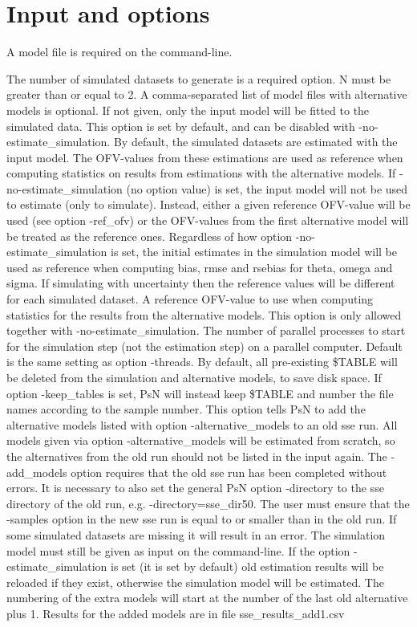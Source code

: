 \section{Input and options}
A model file is required on the command-line.
\begin{optionlist}
The number of simulated datasets to generate is a required option. N must be greater than or equal to 2. 
\nextopt
{}
A comma-separated list of model files with alternative models is optional. If not given, only the input model will be fitted to the simulated data. 
\nextopt
{}
This option is set by default, and can be disabled with -no-estimate\_simulation. By default, the simulated datasets are estimated with the input model. The OFV-values from these estimations are used as reference when computing statistics on results from estimations with the alternative models. If -no-estimate\_simulation (no option value) is set, the input model will not be used to estimate (only to simulate). Instead, either a given reference OFV-value will be used (see option -ref\_ofv) or the OFV-values from the first alternative model will be treated as the reference ones. Regardless of how option -no-estimate\_simulation is set, the initial estimates in the simulation model will be used as reference when computing bias, rmse and rsebias for theta, omega and sigma. If simulating with uncertainty then the reference values will be different for each simulated dataset. 
\nextopt
{}
A reference OFV-value to use when computing statistics for the results from the alternative models. This option is only allowed together with -no-estimate\_simulation. 
\nextopt
{}
The number of parallel processes to start for the simulation step (not the estimation step) on a parallel computer. Default is the same setting as option -threads. 
\nextopt
{}
By default, all pre-existing \$TABLE will be deleted from the simulation and alternative models, to save disk space. If option -keep\_tables is set, 
PsN will instead keep \$TABLE and number the file names according to the sample number.
\nextopt
{}
This option tells PsN to add the alternative models listed with option -alternative\_models to an old sse run. All models given via option -alternative\_models will be estimated from scratch, so the alternatives from the old run should not be listed in the input again. The -add\_models option requires that the old sse run has been completed without errors. It is necessary to also set the general PsN option -directory to the sse directory of the old run,       e.g. -directory=sse\_dir50. The user must ensure that the -samples option in the new sse run is equal to or smaller than in the old run. If some simulated datasets are missing it will result in an error.       The simulation model must still be given as input on the command-line. If the option -estimate\_simulation is set (it is set by default) old estimation results will be reloaded if they exist, otherwise the simulation model will be estimated. The numbering of the extra models will start at the number of the last old alternative plus 1. Results for the added models are in file sse\_results\_add1.csv 

\end{optionlist}
